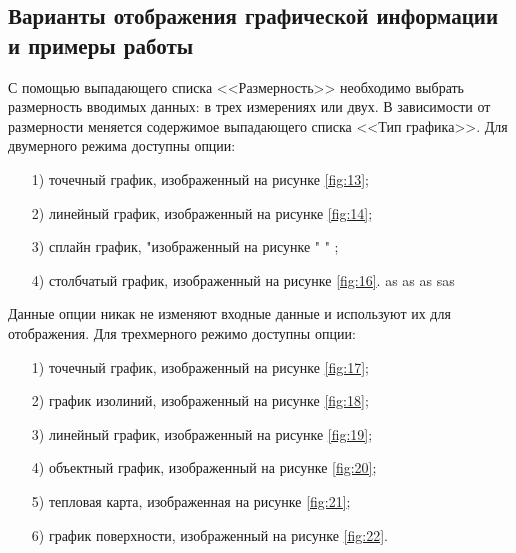 \subsection{Варианты отображения графической информации и примеры работы}
С помощью выпадающего списка <<Размерность>> необходимо выбрать размерность вводимых данных: в трех измерениях или двух. В зависимости от размерности меняется содержимое выпадающего списка <<Тип графика>>. Для двумерного режима доступны опции:
\begin{enumerate}
    \item [1)] точечный график, изображенный на рисунке \ref{fig:13};
    \item [2)] линейный график, изображенный на рисунке \ref{fig:14};
    \item [3)] сплайн график, "изображенный на рисунке    " "  ;
    \item [4)] столбчатый график, изображенный на рисунке \ref{fig:16}. as as as sas 
\end{enumerate}

Данные опции никак не изменяют входные данные и используют их для отображения.
Для трехмерного режимо доступны опции:
\begin{enumerate} 
    \item [1)] точечный график, изображенный на рисунке \ref{fig:17};
    \item [2)] график изолиний, изображенный на рисунке \ref{fig:18};
    \item [3)] линейный график, изображенный на рисунке \ref{fig:19};
    \item [4)] объектный график, изображенный на рисунке \ref{fig:20};
    \item [5)] тепловая карта, изображенная на рисунке \ref{fig:21};
    \item [6)] график поверхности, изображенный на рисунке \ref{fig:22}.
\end{enumerate}


